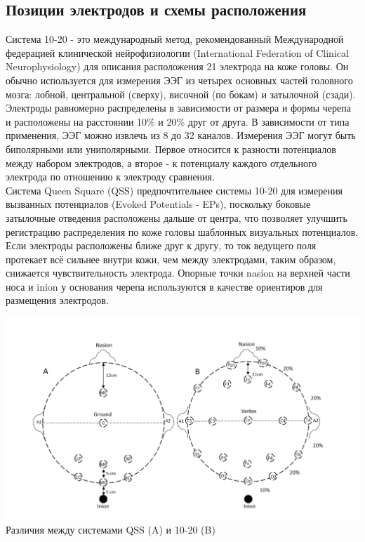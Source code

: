\documentclass[12pt, a4paper, titlepage]{extreport}
\begin{document}
	\subsection*{Позиции электродов и схемы расположения}
	Система 10-20 - это международный метод, рекомендованный Международной федерацией клинической нейрофизиологии (International Federation of Clinical Neurophysiology) для описания расположения 21 электрода на коже головы. Он обычно используется для измерения ЭЭГ из четырех основных частей головного мозга: лобной, центральной (сверху), височной (по бокам) и затылочной (сзади). Электроды равномерно распределены в зависимости от размера и формы черепа и расположены на расстоянии 10\% и 20\% друг от друга. В зависимости от типа применения, ЭЭГ можно извлечь из 8 до 32 каналов. Измерения ЭЭГ могут быть биполярными или униполярными. Первое относится к разности потенциалов между набором электродов, а второе - к потенциалу каждого отдельного электрода по отношению к электроду сравнения.\\
	Система Queen Square (QSS) предпочтительнее системы 10-20 для измерения вызванных потенциалов (Evoked Potentials - EPs), поскольку боковые затылочные отведения расположены дальше от центра, что позволяет улучшить регистрацию распределения по коже головы шаблонных визуальных потенциалов. Если электроды расположены ближе друг к другу, то ток ведущего поля протекает всё сильнее внутри кожи, чем между электродами,
	таким образом, снижается чувствительность электрода. Опорные точки nasion на верхней части носа и inion у основания черепа используются в качестве ориентиров для размещения электродов.\\
	\begin{center}
		\includegraphics[scale=0.5]{placement_system}\\
		Различия между системами QSS (A) и 10-20 (B)
	\end{center}
\end{document}
